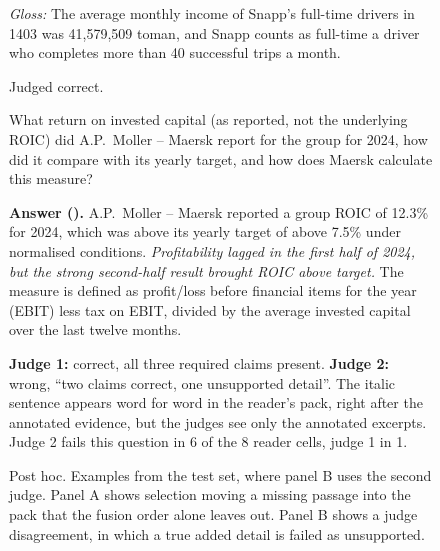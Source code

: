\begin{figure}[tp]
\begin{minipage}[t]{0.495\textwidth}
\begin{tcolorbox}[exs=cLex]
\begin{otherlanguage}{persian}
\end{otherlanguage}
{\color{cAxis}\textit{Gloss:} The average monthly income of Snapp's full-time drivers in 1403 was 41,579,509 toman, and Snapp counts as full-time a driver who completes more than 40 successful trips a month.\par}
Judged correct.
\end{tcolorbox}
\end{minipage}\hfill
\begin{minipage}[t]{0.495\textwidth}
\begin{tcolorbox}[exc, title={B. Two judges disagree on a correct answer (English)}]
What return on invested capital (as reported, not the underlying ROIC) did A.P.\ Moller -- Maersk report for the group for 2024, how did it compare with its yearly target, and how does Maersk calculate this measure?\par
\end{tcolorbox}
\begin{tcolorbox}[exs=cHR]
\textbf{Answer (\lexb{}).} A.P.\ Moller -- Maersk reported a group ROIC of 12.3\% for 2024, which was above its yearly target of above 7.5\% under normalised conditions. \emph{Profitability lagged in the first half of 2024, but the strong second-half result brought ROIC above target.} The measure is defined as profit/loss before financial items for the year (EBIT) less tax on EBIT, divided by the average invested capital over the last twelve months.
\end{tcolorbox}
\begin{tcolorbox}[exs=cSetR]
\textbf{Judge 1:} correct, all three required claims present. \textbf{Judge 2:} wrong, ``two claims correct, one unsupported detail''. The italic sentence appears word for word in the reader's pack, right after the annotated evidence, but the judges see only the annotated excerpts. Judge 2 fails this question in 6 of the 8 reader cells, judge 1 in 1.
\end{tcolorbox}
\end{minipage}
\caption{Post hoc. Examples from the test set, where panel B uses the second judge. Panel A shows selection moving a missing passage into the pack that the fusion order alone leaves out. Panel B shows a judge disagreement, in which a true added detail is failed as unsupported.}
\label{fig:examples}
\end{figure}
